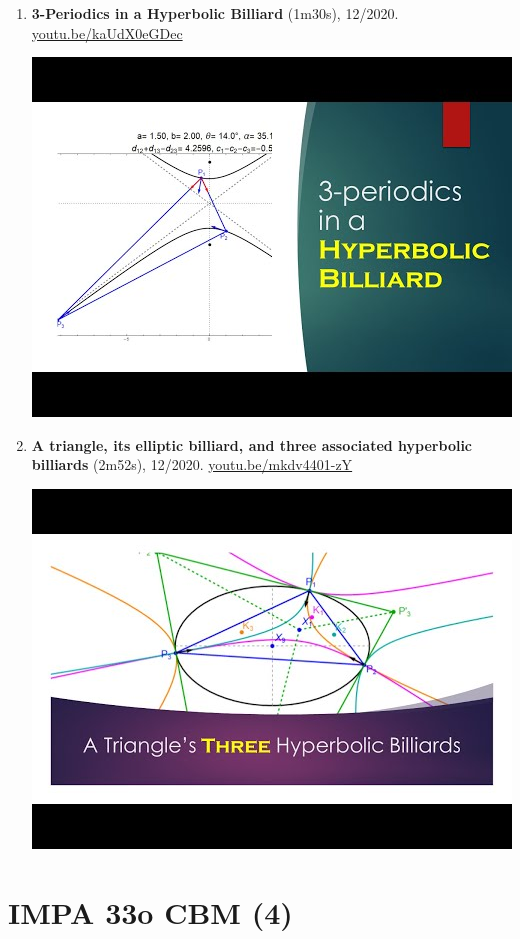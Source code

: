 \documentclass[12pt]{article}
\begin{document}
\begin{enumerate}[resume]
\item \textbf{3-Periodics in a Hyperbolic Billiard} (1m30s), 12/2020. \href{https://youtu.be/kaUdX0eGDec}{\url{youtu.be/kaUdX0eGDec}}
\begin{center}\includegraphics[width=.5\textwidth]{pics/kaUdX0eGDec.jpg}\end{center}
% 
\item \textbf{A triangle, its elliptic billiard, and three associated hyperbolic billiards} (2m52s), 12/2020. \href{https://youtu.be/mkdv4401-zY}{\url{youtu.be/mkdv4401-zY}}
\begin{center}\includegraphics[width=.5\textwidth]{pics/mkdv4401-zY.jpg}\end{center}
% 
\end{enumerate}

\section{IMPA 33o CBM (4)}
\end{document}
